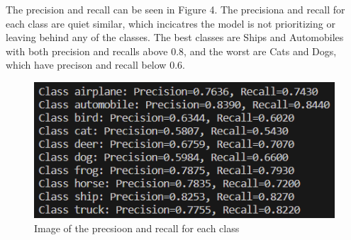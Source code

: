 \documentclass[letterpaper, 12pt]{article}
\begin{document}
The precision and recall can be seen in Figure 4. The precisiona and recall for each class are quiet similar, which incicatres the model is not prioritizing or leaving behind any of the classes. The best classes are Ships and Automobiles with both precision and recalls above 0.8, and the worst are Cats and Dogs, which have precison and recall below 0.6.

\begin{figure}[H]
\centering
\includegraphics[scale = 0.8]{precision_and_recall}
\caption{Image of the precsioon and recall for each class}
\end{figure}
\end{document}
